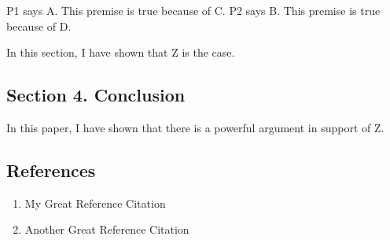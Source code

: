 P1 says A. This premise is true because of C. P2 says B. This premise is
true because of D.

In this section, I have shown that Z is the case.

\subsection{Section 4. Conclusion}\label{section-4.-conclusion}

In this paper, I have shown that there is a powerful argument in support
of Z.

\subsection{References}\label{references}

\begin{enumerate}
\def\labelenumi{\arabic{enumi}.}
\tightlist
\item
  My Great Reference Citation
\item
  Another Great Reference Citation
\end{enumerate}
